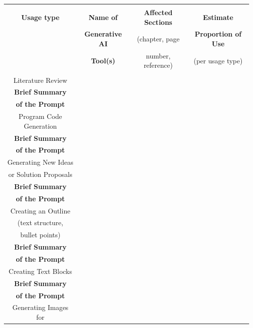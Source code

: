 \small{\noindent
	\begin{tabular}{|c|c|c|c|}\hline
		\hspace{40mm} & \hspace{30mm} & \hspace{30mm} & \hspace{30mm} \\ 
		\textbf{Usage type}	& \textbf{Name of} 	& \textbf{Affected Sections} 	& \textbf{Estimate} \\
		& \textbf{Generative AI} & (chapter, page & \textbf{Proportion of Use} \\ 
		& \textbf{Tool(s)} & number, reference) & (per usage type) \\
		\hspace{40mm} & \hspace{30mm} & \hspace{30mm} & \hspace{30mm} \\ \hline \hline
		Literature Review & & & \\ \hline
		\textbf{Brief Summary}  &\multicolumn{3}{|l|}{} \\
		\textbf{of the Prompt}  &\multicolumn{3}{|l|}{} \\ \hline \hline
		Program Code Generation & & & \\ \hline
		\textbf{Brief Summary}  &\multicolumn{3}{|l|}{} \\
		\textbf{of the Prompt}  &\multicolumn{3}{|l|}{} \\ \hline \hline
		Generating New Ideas & & & \\ 
		or Solution Proposals & & & \\ \hline
		\textbf{Brief Summary}  &\multicolumn{3}{|l|}{} \\
		\textbf{of the Prompt}  &\multicolumn{3}{|l|}{} \\ \hline \hline
		Creating an Outline & & & \\
		(text structure,  & & & \\
		bullet points) & & & \\ \hline
		\textbf{Brief Summary}  &\multicolumn{3}{|l|}{} \\
		\textbf{of the Prompt}  &\multicolumn{3}{|l|}{} \\ \hline \hline
		Creating Text Blocks & & & \\ \hline
		\textbf{Brief Summary}  &\multicolumn{3}{|l|}{} \\
		\textbf{of the Prompt}  &\multicolumn{3}{|l|}{} \\ \hline \hline
		Generating Images for & & & \\

\end{tabular}}
